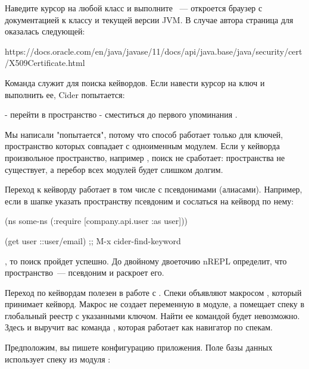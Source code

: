 Наведите курсор на любой класс и выполните ~--- откроется браузер с документацией к классу и текущей версии JVM. В случае автора страница для  оказалась следующей:

\begin{english}
  \begin{text}
https://docs.oracle.com/en/java/javase/11/docs/api/java.base/java/security/cert/X509Certificate.html
  \end{text}
\end{english}

Команда  служит для поиска кейвордов. Если навести курсор на ключ  и выполнить ее, Cider попытается:

- перейти в пространство 
- сместиться до первого упоминания .

Мы написали "попытается", потому что способ работает только для ключей, пространство которых совпадает с одноименным модулем. Если у кейворда произвольное пространство, например , поиск не сработает: пространства  не существует, а перебор всех модулей будет слишком долгим.

Переход к кейворду работает в том числе с псевдонимами (алиасами). Например, если в шапке  указать пространству псевдоним  и сослаться на кейворд по нему:

\begin{english}
  \begin{clojure}
(ns some-ns
  (:require
   [company.api.user :as user]))

(get user ::user/email) ;; M-x cider-find-keyword
  \end{clojure}
\end{english}

, то поиск пройдет успешно. До двойному двоеточию nREPL определит, что пространство~--- псевдоним и раскроет его.

Переход по кейвордам полезен в работе с . Спеки объявляют макросом , который принимает кейворд. Макрос не создает переменную в модуле, а помещает спеку в глобальный реестр с указанными ключом. Найти ее командой  будет невозможно. Здесь и выручит вас команда , которая работает как навигатор по спекам.

Предположим, вы пишете конфигурацию приложения. Поле  базы данных использует спеку из модуля :

